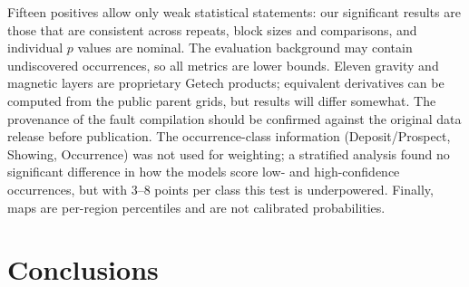 \documentclass[pdflatex,sn-apa]{sn-jnl}
\begin{document}
Fifteen positives allow only weak statistical statements: our significant results are those that are consistent across repeats, block sizes and comparisons, and individual $p$ values are nominal. The evaluation background may contain undiscovered occurrences, so all metrics are lower bounds. Eleven gravity and magnetic layers are proprietary Getech products; equivalent derivatives can be computed from the public parent grids, but results will differ somewhat. The provenance of the fault compilation should be confirmed against the original data release before publication. The occurrence-class information (Deposit/Prospect, Showing, Occurrence) was not used for weighting; a stratified analysis found no significant difference in how the models score low- and high-confidence occurrences, but with 3--8 points per class this test is underpowered. Finally, maps are per-region percentiles and are not calibrated probabilities.

\section{Conclusions}\label{sec:conclusions}
\end{document}
